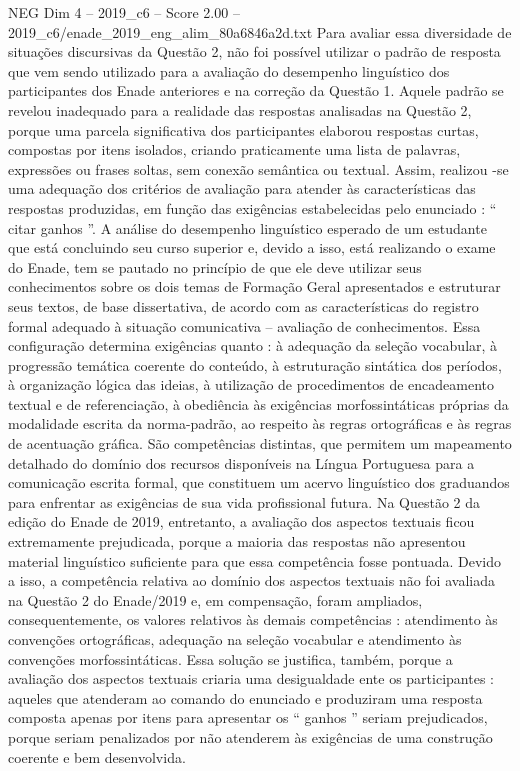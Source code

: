 \begin{textsample}{NEG Dim 4 – 2019\_c6 – Score 2.00 – 2019\_c6/enade\_2019\_eng\_alim\_80a6846a2d.txt}
Para avaliar essa diversidade de situações discursivas da Questão 2, não foi possível utilizar o padrão de resposta que vem sendo utilizado para a avaliação do desempenho linguístico dos participantes dos Enade anteriores e na correção da Questão 1.
Aquele padrão se revelou inadequado para a realidade das respostas analisadas na Questão 2, porque uma parcela significativa dos participantes elaborou respostas curtas, compostas por itens isolados, criando praticamente uma lista de palavras, expressões ou frases soltas, sem conexão semântica ou textual.
Assim, realizou -se uma adequação dos critérios de avaliação para atender às características das respostas produzidas, em função das exigências estabelecidas pelo enunciado : “ citar ganhos ”.
A análise do desempenho linguístico esperado de um estudante que está concluindo seu curso superior e, devido a isso, está realizando o exame do Enade, tem se pautado no princípio de que ele deve utilizar seus conhecimentos sobre os dois temas de Formação Geral apresentados e estruturar seus textos, de base dissertativa, de acordo com as características do registro formal adequado à situação comunicativa – avaliação de conhecimentos.
Essa configuração determina exigências quanto : à adequação da seleção vocabular, à progressão temática coerente do conteúdo, à estruturação sintática dos períodos, à organização lógica das ideias, à utilização de procedimentos de encadeamento textual e de referenciação, à obediência às exigências morfossintáticas próprias da modalidade escrita da norma-padrão, ao respeito às regras ortográficas e às regras de acentuação gráfica.
São competências distintas, que permitem um mapeamento detalhado do domínio dos recursos disponíveis na Língua Portuguesa para a comunicação escrita formal, que constituem um acervo linguístico dos graduandos para enfrentar as exigências de sua vida profissional futura.
Na Questão 2 da edição do Enade de 2019, entretanto, a avaliação dos aspectos textuais ficou extremamente prejudicada, porque a maioria das respostas não apresentou material linguístico suficiente para que essa competência fosse pontuada.
Devido a isso, a competência relativa ao domínio dos aspectos textuais não foi avaliada na Questão 2 do Enade/2019 e, em compensação, foram ampliados, consequentemente, os valores relativos às demais competências : atendimento às convenções ortográficas, adequação na seleção vocabular e atendimento às convenções morfossintáticas.
Essa solução se justifica, também, porque a avaliação dos aspectos textuais criaria uma desigualdade ente os participantes : aqueles que atenderam ao comando do enunciado e produziram uma resposta composta apenas por itens para apresentar os “ ganhos ” seriam prejudicados, porque seriam penalizados por não atenderem às exigências de uma construção coerente e bem desenvolvida.

\end{textsample}

